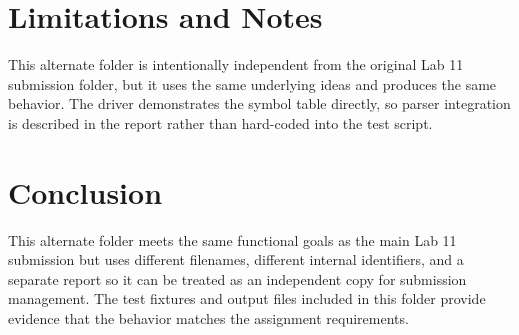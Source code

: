 \documentclass[11pt]{article}
\begin{document}
\section{Limitations and Notes}
This alternate folder is intentionally independent from the original Lab 11 submission folder, but it uses the same underlying ideas and produces the same behavior. The driver demonstrates the symbol table directly, so parser integration is described in the report rather than hard-coded into the test script.

\section{Conclusion}
This alternate folder meets the same functional goals as the main Lab 11 submission but uses different filenames, different internal identifiers, and a separate report so it can be treated as an independent copy for submission management. The test fixtures and output files included in this folder provide evidence that the behavior matches the assignment requirements.
\end{document}
